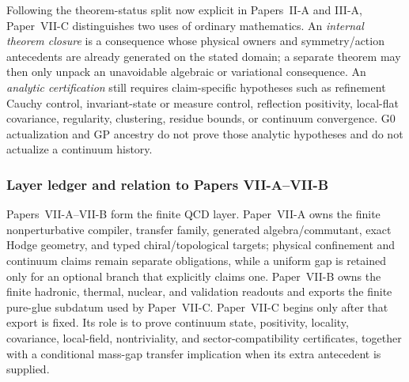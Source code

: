 \documentclass[12pt,a4paper]{article}
\begin{document}
Following the theorem-status split now explicit in Papers~II-A and III-A, Paper~VII-C distinguishes two uses of ordinary mathematics.  An \emph{internal theorem closure} is a consequence whose physical owners and symmetry/action antecedents are already generated on the stated domain; a separate theorem may then only unpack an unavoidable algebraic or variational consequence.  An \emph{analytic certification} still requires claim-specific hypotheses such as refinement Cauchy control, invariant-state or measure control, reflection positivity, local-flat covariance, regularity, clustering, residue bounds, or continuum convergence.  G0 actualization and GP ancestry do not prove those analytic hypotheses and do not actualize a continuum history.


\subsubsection{Layer ledger and relation to Papers VII-A--VII-B}
\label{p12:sec:why-separate}

Papers~VII-A--VII-B form the finite QCD layer.  Paper~VII-A owns the finite nonperturbative compiler, transfer family, generated algebra/commutant, exact Hodge geometry, and typed chiral/topological targets; physical confinement and continuum claims remain separate obligations, while a uniform gap is retained only for an optional branch that explicitly claims one.  Paper~VII-B owns the finite hadronic, thermal, nuclear, and validation readouts and exports the finite pure-glue subdatum used by Paper~VII-C.  Paper~VII-C begins only after that export is fixed.  Its role is to prove continuum state, positivity, locality, covariance, local-field, nontriviality, and sector-compatibility certificates, together with a conditional mass-gap transfer implication when its extra antecedent is supplied.
\end{document}
